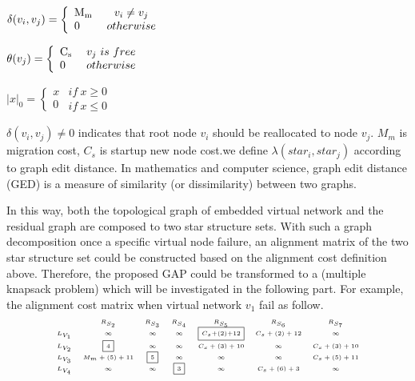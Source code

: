 $\delta ({v_i},{v_j}) = \left\{ \begin{array}{l}
{\rm{M_{m}}}\\
0
\end{array} \right.\begin{array}{*{20}{c}}
v_i\neq v_j\\
{otherwise}
\end{array}$

$\theta ({v_j}) = \left\{ \begin{array}{l}
{\rm{C_{s}}}\\
0
\end{array} \right.\begin{array}{*{20}{c}}
v_j\ is\ free\\
{otherwise}
\end{array}$

$|x|_0 = \left\{ \begin{array}{l}
{x}\\
0
\end{array} \right.\begin{array}{*{20}{c}}
if\ x\geq 0\\
{if\ x\leq 0}
\end{array}$

$\delta(v_i,v_j)\neq 0$ indicates that  root node $v_i$ should be reallocated to node $v_j$. $M_m$ is migration cost, $C_s$ is startup new node cost.we define $\lambda(star_i,star_j)$ according to graph edit distance\cite{sanfeliu1983distance}. In mathematics and computer science, graph edit distance (GED) is a measure of similarity (or dissimilarity) between two graphs.

In this way, both the topological graph of  embedded virtual network and the residual graph are composed to two star structure sets. With such a graph decomposition once a specific virtual node failure, an alignment matrix of the two star structure set could be constructed based on the alignment cost definition above. Therefore, the proposed GAP could be transformed to a (multiple knapsack problem) which will be investigated in the following part. For example, the alignment cost matrix when virtual network $v_1$ fail as follow.
\begin{equation*}
\tiny{
 {\begin{array}{*{20}{c}}
&R_{S_{2}}&R_{S_3}&R_{S_4}&R_{S_5}&R_{S_6}&R_{S_{7}}\\
{L_{V_1}}&\infty&\infty&\infty&\fbox{$C_{s}$+(2)+12}&C_{s}+(2)+12&\infty\\
L_{V_2}&\fbox{4}&\infty&\infty&C_{s}+(3)+10&\infty&C_{s}+(3)+10\\
L_{V_3}&M_{m}+(5)+11&\fbox{5}&\infty&\infty&\infty&C_{s}+(5)+11\\
L_{V_4}&\infty&\infty&\fbox{3}&\infty&C_{s}+(6)+3&\infty\\
\end{array}}
}
\label{lab:Node1FaliureAlignmentMatrix}
\end{equation*}


